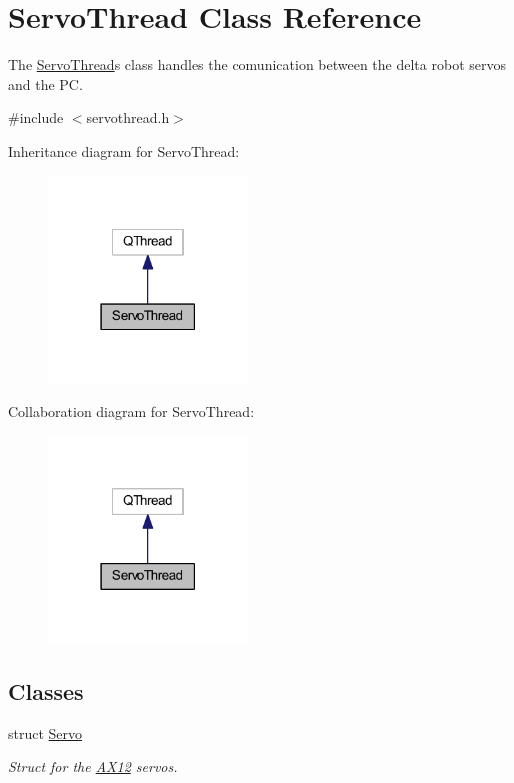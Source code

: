 \hypertarget{a00007}{}\section{Servo\+Thread Class Reference}
\label{a00007}


The \hyperlink{a00007}{Servo\+Thread}\textquotesingle{}s class handles the comunication between the delta robot servos and the P\+C.  




{\ttfamily \#include $<$servothread.\+h$>$}



Inheritance diagram for Servo\+Thread\+:\nopagebreak
\begin{figure}[H]
\begin{center}
\leavevmode
\includegraphics[width=150pt]{de/d8c/a00036}
\end{center}
\end{figure}


Collaboration diagram for Servo\+Thread\+:\nopagebreak
\begin{figure}[H]
\begin{center}
\leavevmode
\includegraphics[width=150pt]{d1/dc6/a00037}
\end{center}
\end{figure}
\subsection*{Classes}
\begin{DoxyCompactItemize}
\item 
struct \hyperlink{a00006}{Servo}
\begin{DoxyCompactList}\small\item\em Struct for the \hyperlink{a00001}{A\+X12} servos. \end{DoxyCompactList}\end{DoxyCompactItemize}
